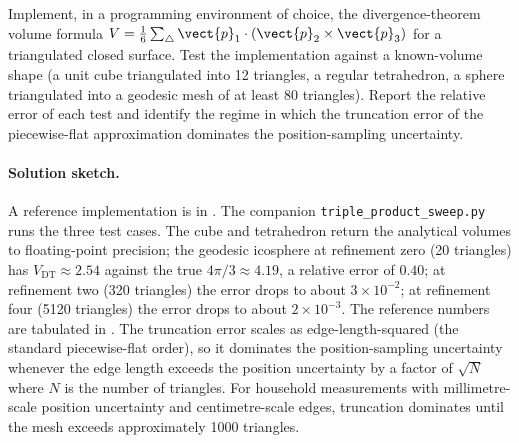 \begin{exercise}
Implement, in a programming environment of choice, the
divergence-theorem volume formula
$V = \tfrac{1}{6}\sum_{\triangle} \vect{p}_{1}\cdot(\vect{p}_{2}
\times \vect{p}_{3})$ for a triangulated closed surface. Test the
implementation against a known-volume shape (a unit cube
triangulated into 12 triangles, a regular tetrahedron, a sphere
triangulated into a geodesic mesh of at least 80 triangles). Report
the relative error of each test and identify the regime in which
the truncation error of the piecewise-flat approximation
dominates the position-sampling uncertainty.

\paragraph{Solution sketch.} A reference implementation is in
.
The companion \texttt{triple\_product\_sweep.py} runs the three test
cases. The cube and tetrahedron return the analytical volumes to
floating-point precision; the geodesic icosphere at refinement zero
(20 triangles) has $V_{\text{DT}} \approx 2.54$ against the true
$4\pi/3 \approx 4.19$, a relative error of $0.40$; at refinement
two (320 triangles) the error drops to about $3 \times 10^{-2}$;
at refinement four (5120 triangles) the error drops to about
$2 \times 10^{-3}$. The reference numbers are tabulated in
. The truncation error scales as
edge-length-squared (the standard piecewise-flat order), so it
dominates the position-sampling uncertainty whenever the edge
length exceeds the position uncertainty by a factor of $\sqrt{N}$
where $N$ is the number of triangles. For household measurements
with millimetre-scale position uncertainty and centimetre-scale
edges, truncation dominates until the mesh exceeds approximately
1000 triangles.
\end{exercise}

